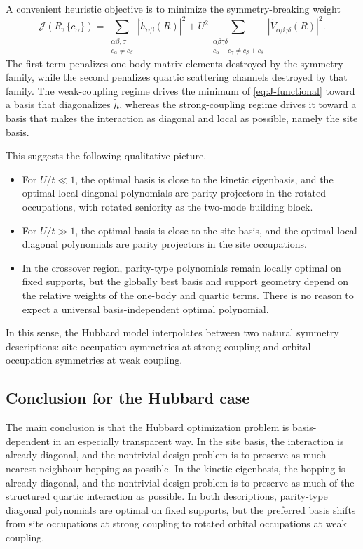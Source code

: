 \documentclass[11pt]{article}
\theoremstyle{definition}
\theoremstyle{remark}
\begin{document}
A convenient heuristic objective is to minimize the symmetry-breaking weight
\begin{equation}
  \mathcal J(R,\{c_\alpha\})
  =
  \sum_{\substack{\alpha\beta,\sigma\\ c_\alpha\neq c_\beta}}
  \left|\widetilde h_{\alpha\beta}(R)\right|^2
  +U^2
  \sum_{\substack{\alpha\beta\gamma\delta\\ c_\alpha+c_\gamma\neq c_\beta+c_\delta}}
  \left|\widetilde V_{\alpha\beta\gamma\delta}(R)\right|^2.
  \label{eq:J-functional}
\end{equation}
The first term penalizes one-body matrix elements destroyed by the symmetry family, while the second penalizes quartic scattering channels destroyed by that family. The weak-coupling regime drives the minimum of \eqref{eq:J-functional} toward a basis that diagonalizes $\widetilde h$, whereas the strong-coupling regime drives it toward a basis that makes the interaction as diagonal and local as possible, namely the site basis.

This suggests the following qualitative picture.
\begin{itemize}[leftmargin=2em]
  \item For $U/t\ll 1$, the optimal basis is close to the kinetic eigenbasis, and the optimal local diagonal polynomials are parity projectors in the rotated occupations, with rotated seniority as the two-mode building block.
  \item For $U/t\gg 1$, the optimal basis is close to the site basis, and the optimal local diagonal polynomials are parity projectors in the site occupations.
  \item In the crossover region, parity-type polynomials remain locally optimal on fixed supports, but the globally best basis and support geometry depend on the relative weights of the one-body and quartic terms. There is no reason to expect a universal basis-independent optimal polynomial.
\end{itemize}
In this sense, the Hubbard model interpolates between two natural symmetry descriptions: site-occupation symmetries at strong coupling and orbital-occupation symmetries at weak coupling.

\subsection{Conclusion for the Hubbard case}
The main conclusion is that the Hubbard optimization problem is basis-dependent in an especially transparent way. In the site basis, the interaction is already diagonal, and the nontrivial design problem is to preserve as much nearest-neighbour hopping as possible. In the kinetic eigenbasis, the hopping is already diagonal, and the nontrivial design problem is to preserve as much of the structured quartic interaction as possible. In both descriptions, parity-type diagonal polynomials are optimal on fixed supports, but the preferred basis shifts from site occupations at strong coupling to rotated orbital occupations at weak coupling.
\end{document}
